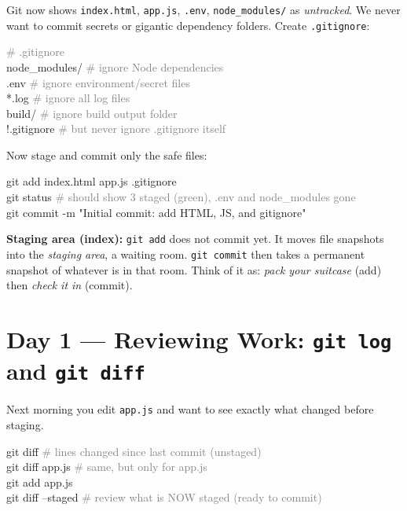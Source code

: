 \documentclass[10pt,a4paper]{article}
\newenvironment{codebox}{%
  \begin{mdframed}[backgroundcolor=codebg, linewidth=0pt,
    innerleftmargin=6pt, innerrightmargin=6pt,
    innertopmargin=4pt, innerbottommargin=4pt]%
  \small\ttfamily
}{%
  \end{mdframed}%
}
\newenvironment{notebox}{%
  \begin{mdframed}[backgroundcolor=notebg, linewidth=0.6pt,
    innerleftmargin=6pt, innerrightmargin=6pt,
    innertopmargin=3pt, innerbottommargin=3pt]%
  \small
}{%
  \end{mdframed}%
}
\newcommand{\cmd}[1]{\texttt{\small #1}}
\begin{document}
Git now shows \texttt{index.html}, \texttt{app.js}, \texttt{.env}, \texttt{node\_modules/} as
\emph{untracked}. We never want to commit secrets or gigantic dependency folders.
Create \texttt{.gitignore}:

\begin{codebox}
\textcolor{gray}{\# .gitignore}\\
node\_modules/     \textcolor{gray}{\# ignore Node dependencies}\\
.env              \textcolor{gray}{\# ignore environment/secret files}\\
*.log             \textcolor{gray}{\# ignore all log files}\\
build/            \textcolor{gray}{\# ignore build output folder}\\
!.gitignore       \textcolor{gray}{\# but never ignore .gitignore itself}
\end{codebox}

Now stage and commit only the safe files:

\begin{codebox}
git add index.html app.js .gitignore\\
git status          \textcolor{gray}{\# should show 3 staged (green), .env and node\_modules gone}\\
git commit -m "Initial commit: add HTML, JS, and gitignore"
\end{codebox}

\begin{notebox}
\textbf{Staging area (index):} \cmd{git add} does not commit yet.
It moves file snapshots into the \emph{staging area}, a waiting room.
\cmd{git commit} then takes a permanent snapshot of whatever is in that room.
Think of it as: \emph{pack your suitcase} (add) then \emph{check it in} (commit).
\end{notebox}

\section{Day 1 --- Reviewing Work: \texttt{git log} and \texttt{git diff}}

Next morning you edit \texttt{app.js} and want to see exactly what changed before staging.

\begin{codebox}
git diff                    \textcolor{gray}{\# lines changed since last commit (unstaged)}\\
git diff app.js             \textcolor{gray}{\# same, but only for app.js}\\
git add app.js\\
git diff --staged           \textcolor{gray}{\# review what is NOW staged (ready to commit)}
\end{codebox}
\end{document}
